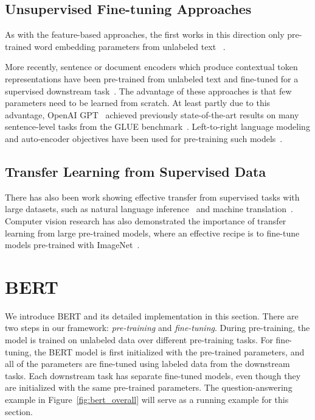 \subsection{Unsupervised Fine-tuning Approaches}

As with the feature-based approaches, the first works in this direction only pre-trained word embedding parameters from unlabeled text ~\cite{collobert-weston:2008}.  

More recently, sentence or document encoders which produce contextual token representations have been pre-trained from unlabeled text and fine-tuned for a supervised downstream task~\cite{dai-le:2015:_semi, howard-ruder:2018, radford-etal:2018}.  The advantage of these approaches is that few parameters need to be learned from scratch. At least partly due to this advantage, OpenAI GPT~\cite{radford-etal:2018} achieved previously state-of-the-art results on many sentence-level tasks from the GLUE benchmark~\cite{wang-etal:2018:_glue}.  Left-to-right language modeling and auto-encoder objectives have been used for pre-training such models~\cite{howard-ruder:2018, radford-etal:2018,dai-le:2015:_semi}.

\subsection{Transfer Learning from Supervised Data}

There has also been work showing effective transfer from supervised tasks with large datasets, such as natural language inference~\cite{conneau-EtAl:2017:EMNLP2017} and machine translation~\cite{mccann-etal:2017:_learn_trans}. Computer vision research has also demonstrated the importance of transfer learning from large pre-trained models, where an effective recipe is to fine-tune models pre-trained with ImageNet~\cite{imagenet_cvpr09, yosinski2014transferable}. 

\section{BERT}
\label{sec:bert}

We introduce BERT and its detailed implementation in this section. There are two steps in our framework: {\em pre-training} and {\em fine-tuning}. During pre-training, the model is trained on unlabeled data over different pre-training tasks. For fine-tuning, the BERT model is first initialized with the pre-trained parameters, and all of the parameters are fine-tuned using labeled data from the downstream tasks. Each downstream task has separate fine-tuned models, even though they are initialized with the same pre-trained parameters. The question-answering example in Figure~\ref{fig:bert_overall} will serve as a running example for this section.

